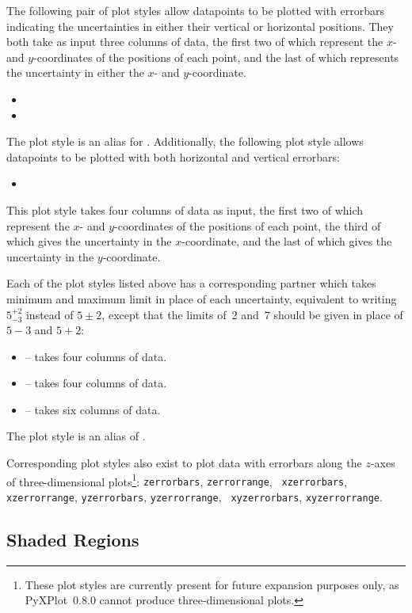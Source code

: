 The following pair of plot styles allow datapoints to be plotted with errorbars
indicating the uncertainties in either their vertical or horizontal positions.
They both take as input three columns of data, the first two of which represent
the $x$- and $y$-coordinates of the positions of each point, and the last of
which represents the uncertainty in either the $x$- and $y$-coordinate.
\begin{itemize}
\item {}
\item {}
\end{itemize}
The plot style  is an alias for .
Additionally, the following plot style allows datapoints to be plotted with
both horizontal and vertical errorbars:
\begin{itemize}
\item {}
\end{itemize}
This plot style takes four columns of data as input, the first two of which
represent the $x$- and $y$-coordinates of the positions of each point, the
third of which gives the uncertainty in the $x$-coordinate, and the last of
which gives the uncertainty in the $y$-coordinate.

Each of the plot styles listed above has a corresponding partner which takes
minimum and maximum limit in place of each uncertainty, equivalent to writing
$5^{+2}_{-3}$ instead of $5\pm2$, except that the limits of~2 and~7 should be
given in place of $5-3$ and $5+2$:
\begin{itemize}
\item {} -- takes four columns of data.
\item {} -- takes four columns of data.
\item {} -- takes six columns of data.
\end{itemize}
The plot style  is an alias of .

Corresponding plot styles also exist to plot data with errorbars along the
$z$-axes of three-dimensional plots\footnote{These plot styles are currently
present for future expansion purposes only, as PyXPlot~0.8.0 cannot produce
three-dimensional plots.}: {\tt zerrorbars}, {\tt zerrorrange}, {\tt
xzerrorbars}, {\tt xzerrorrange}, {\tt yzerrorbars}, {\tt yzerrorrange}, {\tt
xyzerrorbars}, {\tt xyzerrorrange}.

\subsection{Shaded Regions}

